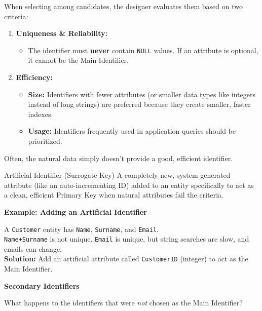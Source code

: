 When selecting among candidates, the designer evaluates them based on two criteria:

\begin{enumerate}
    \item \textbf{Uniqueness \& Reliability:} 
    \begin{itemize}
        \item The identifier must \textbf{never} contain \texttt{NULL} values. If an attribute is optional, it cannot be the Main Identifier.
    \end{itemize}
    \item \textbf{Efficiency:}
    \begin{itemize}
        \item \textbf{Size:} Identifiers with fewer attributes (or smaller data types like integers instead of long strings) are preferred because they create smaller, faster indexes.
        \item \textbf{Usage:} Identifiers frequently used in application queries should be prioritized.
    \end{itemize}
\end{enumerate}


Often, the natural data simply doesn't provide a good, efficient identifier. 

\begin{defbox}{Artificial Identifier (Surrogate Key)}
A completely new, system-generated attribute (like an auto-incrementing ID) added to an entity specifically to act as a clean, efficient Primary Key when natural attributes fail the criteria.
\end{defbox}

\vspace{0.2cm}
\begin{example}{\textbf{Example: Adding an Artificial Identifier}}

A \texttt{Customer} entity has \texttt{Name}, \texttt{Surname}, and \texttt{Email}. \\
\texttt{Name+Surname} is not unique. \texttt{Email} is unique, but string searches are slow, and emails can change.\\
\textbf{Solution:} Add an artificial attribute called \texttt{CustomerID} (integer) to act as the Main Identifier.
\end{example}

\vs
\textbf{Secondary Identifiers}

What happens to the identifiers that were \textit{not} chosen as the Main Identifier? 

